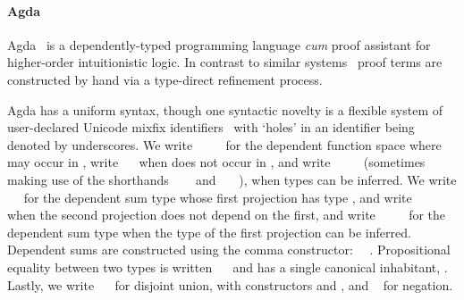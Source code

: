 

\paragraph{Agda}

Agda~\cite{norell_dependently_2009} is a dependently-typed programming language \emph{cum} proof assistant for higher-order intuitionistic logic.
In contrast to similar systems~\cite{bertot_short_2008,asperti_matita_2011} proof terms are constructed by hand via a type-direct refinement process.

Agda has a uniform syntax, though one syntactic novelty is a flexible system of user-declared Unicode mixfix identifiers~\cite{danielsson_parsing_2011} with `holes' in an identifier being denoted by underscores.
We write \AgdaSymbol{(}~\AgdaSymbol{:}~\AgdaSymbol{)}~~ for the dependent function space where  may occur in , write ~~ when  does not occur in , and write \AgdaSymbol{\{}~\AgdaSymbol{:}~\AgdaSymbol{\}}~~ (sometimes making use of the shorthands ~~~ and ~\AgdaSymbol{\{}\AgdaSymbol{\}}~~), when types can be inferred.
We write ~~ for the dependent sum type whose first projection has type , and write ~~ when the second projection does not depend on the first, and write ~~~~ for the dependent sum type when the type of the first projection can be inferred.
Dependent sums are constructed using the comma constructor: ~\AgdaInductiveConstructor{,}~.
Propositional equality between two types is written ~~ and has a single canonical inhabitant, .
Lastly, we write ~~ for disjoint union, with constructors  and , and ~ for negation.

